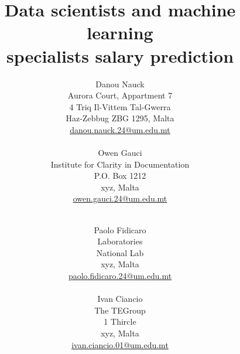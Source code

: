 \documentclass[11pt,a4paper]{article}
\begin{document}
\title{Data scientists and machine learning \\
specialists salary prediction}

\author{%
Danou Nauck \\
Aurora Court, Appartment 7\\
4 Triq Il-Vittem Tal-Gwerra\\
Haz-Zebbug ZBG 1295, Malta\\
\href{mailto:danou.nauck.24@um.edu.mt}{danou.nauck.24@um.edu.mt} \\ \\
Owen Gauci \\
Institute for Clarity in Documentation\\
P.O. Box 1212\\
xyz, Malta\\
\href{mailto:owen.gauci.24@um.edu.mt}{owen.gauci.24@um.edu.mt}  \\ \\
\and %
Paolo Fidicaro \\
Laboratories\\
National Lab\\
xyz, Malta\\
\href{mailto:paolo.fidicaro.24@um.edu.mt}{paolo.fidicaro.24@um.edu.mt} \\ \\
Ivan Ciancio \\
The TEGroup\\
1 Thircle\\
xyz, Malta \\ 
\href{mailto:ivan.ciancio.01@um.edu.mt}{ivan.ciancio.01@um.edu.mt} \\ \\
}

\IEEEoverridecommandlockouts
\author{
\and
{} \\
\and
{} \\
\and
{} \\
}
\end{document}
